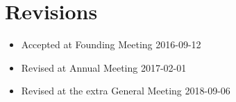 \section*{Revisions}

\begin{itemize}
  \item Accepted at Founding Meeting 2016-09-12
  \item Revised at Annual Meeting 2017-02-01
  \item Revised at the extra General Meeting 2018-09-06  
\end{itemize}